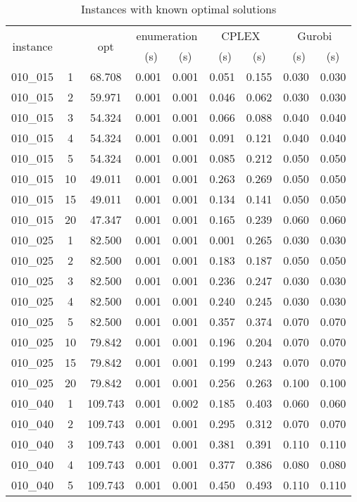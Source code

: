 \documentclass[10pt]{article}
\begin{document}
\begin{table}[H] \footnotesize
	\caption{Instances with known optimal solutions}
	\centering
\begin{tabular}{ccc|cc|cc|cc}
\hline 
\multirow{2}{*}{{instance}} & \multirow{2}{*}{{}} & \multirow{2}{*}{{opt}} & \multicolumn{2}{c|}{{enumeration}} & \multicolumn{2}{c|}{{CPLEX}} & \multicolumn{2}{c}{{Gurobi}}\tabularnewline
\cline{4-9} 
 &  &  & \multicolumn{1}{c}{~(s)} &  (s) & ~(s) &  (s) & ~(s) &  (s)\tabularnewline
\hline 
{010\_015} & {1} & {68.708} & {0.001} & {0.001} & {0.051} & {0.155} & {0.030} & {0.030}\tabularnewline
{010\_015} & {2} & {59.971} & {0.001} & {0.001} & {0.046} & {0.062} & {0.030} & {0.030}\tabularnewline
{010\_015} & {3} & {54.324} & {0.001} & {0.001} & {0.066} & {0.088} & {0.040} & {0.040}\tabularnewline
{010\_015} & {4} & {54.324} & {0.001} & {0.001} & {0.091} & {0.121} & {0.040} & {0.040}\tabularnewline
{010\_015} & {5} & {54.324} & {0.001} & {0.001} & {0.085} & {0.212} & {0.050} & {0.050}\tabularnewline
{010\_015} & {10} & {49.011} & {0.001} & {0.001} & {0.263} & {0.269} & {0.050} & {0.050}\tabularnewline
{010\_015} & {15} & {49.011} & {0.001} & {0.001} & {0.134} & {0.141} & {0.050} & {0.050}\tabularnewline
{010\_015} & {20} & {47.347} & {0.001} & {0.001} & {0.165} & {0.239} & {0.060} & {0.060}\tabularnewline
\hline 
{010\_025} & {1} & {82.500} & {0.001} & {0.001} & {0.001} & {0.265} & {0.030} & {0.030}\tabularnewline
{010\_025} & {2} & {82.500} & {0.001} & {0.001} & {0.183} & {0.187} & {0.050} & {0.050}\tabularnewline
{010\_025} & {3} & {82.500} & {0.001} & {0.001} & {0.236} & {0.247} & {0.030} & {0.030}\tabularnewline
{010\_025} & {4} & {82.500} & {0.001} & {0.001} & {0.240} & {0.245} & {0.030} & {0.030}\tabularnewline
{010\_025} & {5} & {82.500} & {0.001} & {0.001} & {0.357} & {0.374} & {0.070} & {0.070}\tabularnewline
{010\_025} & {10} & {79.842} & {0.001} & {0.001} & {0.196} & {0.204} & {0.070} & {0.070}\tabularnewline
{010\_025} & {15} & {79.842} & {0.001} & {0.001} & {0.199} & {0.243} & {0.070} & {0.070}\tabularnewline
{010\_025} & {20} & {79.842} & {0.001} & {0.001} & {0.256} & {0.263} & {0.100} & {0.100}\tabularnewline
\hline 
{010\_040} & {1} & {109.743} & {0.001} & {0.002} & {0.185} & {0.403} & {0.060} & {0.060}\tabularnewline
{010\_040} & {2} & {109.743} & {0.001} & {0.001} & {0.295} & {0.312} & {0.070} & {0.070}\tabularnewline
{010\_040} & {3} & {109.743} & {0.001} & {0.001} & {0.381} & {0.391} & {0.110} & {0.110}\tabularnewline
{010\_040} & {4} & {109.743} & {0.001} & {0.001} & {0.377} & {0.386} & {0.080} & {0.080}\tabularnewline
{010\_040} & {5} & {109.743} & {0.001} & {0.001} & {0.450} & {0.493} & {0.110} & {0.110}\tabularnewline

\end{tabular}
\end{table}
\end{document}

